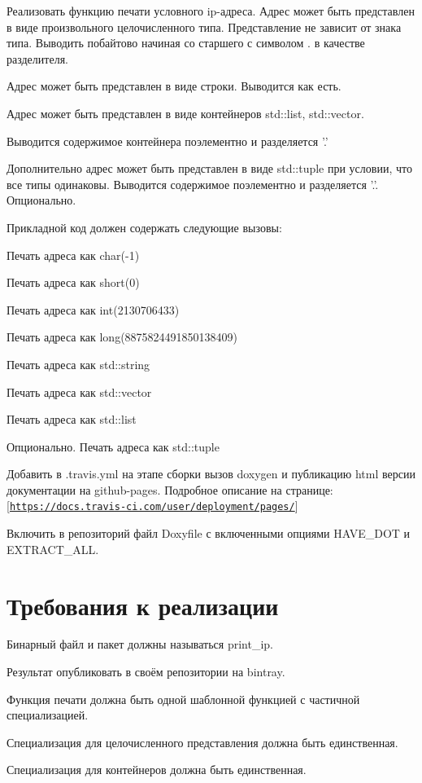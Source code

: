 Реализовать функцию печати условного ip-\/адреса. Адрес может быть представлен в виде произвольного целочисленного типа. Представление не зависит от знака типа. Выводить побайтово начиная со старшего с символом . в качестве разделителя.

Адрес может быть представлен в виде строки. Выводится как есть.

Адрес может быть представлен в виде контейнеров std\-::list, std\-::vector.

Выводится содержимое контейнера поэлементно и разделяется '.'

Дополнительно адрес может быть представлен в виде std\-::tuple при условии, что все типы одинаковы. Выводится содержимое поэлементно и разделяется '.'. Опционально.

Прикладной код должен содержать следующие вызовы\-:
\begin{DoxyItemize}
\item Печать адреса как char(-\/1)
\item Печать адреса как short(0)
\item Печать адреса как int(2130706433)
\item Печать адреса как long(8875824491850138409)
\item Печать адреса как std\-::string
\item Печать адреса как std\-::vector
\item Печать адреса как std\-::list
\item Опционально. Печать адреса как std\-::tuple
\end{DoxyItemize}

Добавить в .travis.\-yml на этапе сборки вызов doxygen и публикацию html версии документации на github-\/pages. Подробное описание на странице\-: \mbox{[}\href{https://docs.travis-ci.com/user/deployment/pages/}{\tt https\-://docs.\-travis-\/ci.\-com/user/deployment/pages/}\mbox{]}

Включить в репозиторий файл {\ttfamily Doxyfile} с включенными опциями {\ttfamily H\-A\-V\-E\-\_\-\-D\-O\-T} и {\ttfamily E\-X\-T\-R\-A\-C\-T\-\_\-\-A\-L\-L}.

\section*{Требования к реализации}


\begin{DoxyItemize}
\item Бинарный файл и пакет должны называться print\-\_\-ip.
\item Результат опубликовать в своём репозитории на bintray.
\item Функция печати должна быть одной шаблонной функцией с частичной специализацией.
\item Специализация для целочисленного представления должна быть единственная.
\item Специализация для контейнеров должна быть единственная.
\end{DoxyItemize}

